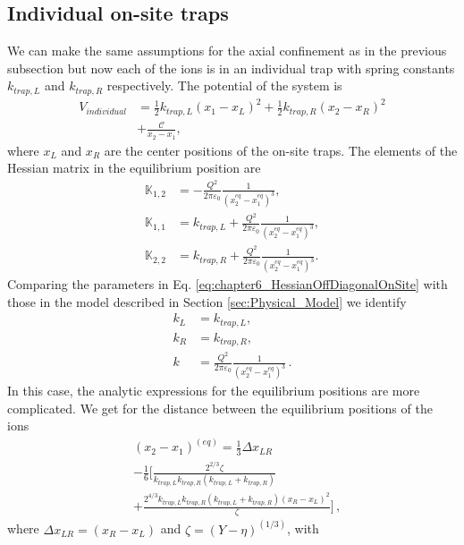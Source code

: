 \subsection{Individual on-site traps}
%
%
%
We can make the same assumptions for the axial confinement as in the previous subsection but now each of the ions is in an individual trap with spring constants $k_{trap,L}$ and $k_{trap,R}$ respectively. The potential of the system is
%
\begin{align}
    V_{individual} &= \frac{1}{2}k_{trap,L}\left(x_1 -x_L\right)^2 +\frac{1}{2}k_{trap, R}\left(x_2 -x_R\right)^2 \nonumber \\&+ \frac{\mathcal{C}}{x_2-x_1},
\end{align}
%
where $x_L$ and $x_R$ are the center positions of the on-site traps. The elements of the Hessian matrix in the equilibrium position are
%
\begin{align}
  \mathbb{K}_{1,2} &= -\frac{Q^2}{2\pi\varepsilon_0}\frac{1}{(x_2^{eq}-x_1^{eq})^3},\nonumber
  \\
  \mathbb{K}_{1,1} &= k_{trap,L} + \frac{Q^2}{2\pi\varepsilon_0}\frac{1}{(x_2^{eq}-x_1^{eq})^3},\nonumber
  \\
  \mathbb{K}_{2,2} &= k_{trap,R} + \frac{Q^2}{2\pi\varepsilon_0}\frac{1}{(x_2^{eq}-x_1^{eq})^3}.
  \label{eq:chapter6_HessianOffDiagonalOnSite}
\end{align}
%
Comparing the parameters in Eq. \eqref{eq:chapter6_HessianOffDiagonalOnSite} with those in the model described in Section \ref{sec:Physical_Model} we identify
\begin{align}
  k_L &= k_{trap,L},\nonumber\\
  k_R &= k_{trap,R},\nonumber\\
  k &= \frac{Q^2}{2\pi\varepsilon_0}\frac{1}{(x_2^{eq}-x_1^{eq})^3}\,.
\end{align}
%
In this case, the analytic expressions for the equilibrium positions are more complicated. We get for the distance between the equilibrium positions of the ions
%
\begin{align}
  &(x_2 - x_1)^{(eq)} = \frac{1}{3} \Delta x_{LR}\nonumber\\
  &- \frac{1}{6}\Big[ \frac{2^{2/3}\zeta}{k_{trap,L} k_{trap,R} (k_{trap,L} + k_{trap,R})}\nonumber\\
  &+ \frac{2^{4/3} k_{trap,L} k_{trap,R} (k_{trap,L} + k_{trap,R}) (x_R-x_L)^2}{\zeta} \Big]\,,
\end{align}
%
where $\Delta x_{LR} = (x_R-x_L)$ and $\zeta = \left( Y - \eta \right)^{(1/3)}$, with
